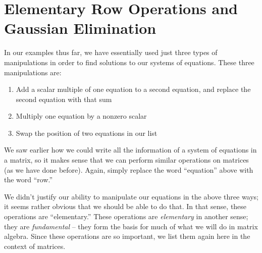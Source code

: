 \section{Elementary Row Operations and Gaussian Elimination}\label{sec:gaussian_elimination}


In our examples thus far, we have essentially used just three types of manipulations in order to find solutions to our systems of equations. These three manipulations are:

\begin{enumerate}
\item		Add a scalar multiple of one equation to a second equation, and replace the second equation with that sum
\item		Multiply one equation by a nonzero scalar
\item		Swap the position of two equations in our list
\end{enumerate}

We saw earlier how we could write all the information of a system of equations in a matrix, so it makes sense that we can perform similar operations on matrices (as we have done before). Again, simply replace the word ``equation'' above with the word ``row.'' 

We didn't justify our ability to  manipulate our equations in the above three ways; it seems rather obvious that we should be able to do that. In that sense, these operations are ``elementary.'' These operations are \textit{elementary} in another sense; they are \textit{fundamental} -- they form the basis for much of what we will do in matrix algebra. Since these operations are so important, we list them again here in the context of matrices.

